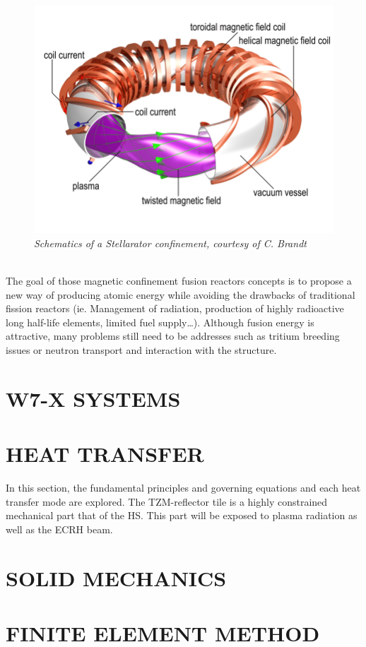 \begin{figure}[h!]
    \centering
    \includegraphics[width=.9\textwidth]{figures/fig_3.png}
    \caption{\it Schematics of a Stellarator confinement, courtesy of C. Brandt}
\end{figure}
\\
\normalsize{\indent The goal of those magnetic confinement fusion reactors concepts is to propose a new way of producing atomic energy while avoiding the drawbacks of traditional fission reactors (ie. Management of radiation, production of highly radioactive long half-life elements, limited fuel supply…). Although fusion energy is attractive, many problems still need to be addresses such as tritium breeding issues or neutron transport and interaction with the structure.}
\section{W7-X SYSTEMS}

\section{HEAT TRANSFER}
\normalsize{In this section, the fundamental principles and governing equations and each heat transfer mode are explored. The TZM-reflector tile is a highly constrained mechanical part that of the \acrshort{HS}. This part will be exposed to plasma radiation as well as the \acrshort{ECRH} beam.}




\section{SOLID MECHANICS}

\section{FINITE ELEMENT METHOD}

